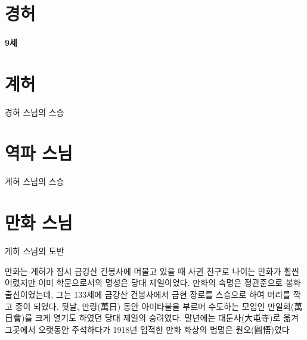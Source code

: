 \documentclass[12pt, a4paper, oneside]{book}
\let\stdsection\section
\renewcommand\section{\newpage\stdsection}
\begin{document}
%										
	\section{ 경허 }


\paragraph{9세}


%										
	\section{ 계허 }
경허 스님의 스승


%										
	\section{ 역파 스님 }

계허 스님의 스승

%										
	\section{ 만화 스님 }

게허 스님의 도반

만화는 계허가 잠시 금강산 건봉사에 머물고 있을 때 사귄 친구로 나이는 만화가 휠씬 어렸지만 이미 학문으로서의 명성은 당대 제일이었다.
만화의 속명은 정관준으로 봉화 출신이었는데, 그는 133세에 금강산 건봉사에서 금현 장로를 스승으로 하여 머리를 깍고 중이 되었다.
뒷날, 만링(萬日) 동안 아미타불을 부르며 수도하는 모임인 만일회(萬日會)를 크게 열기도 하였던 당대 제일의 승려였다.
말년에는 대둔사(大屯寺)로 옮겨 그곳에서 오랫동안 주석하다가 1918년 입적한 만화 화상의 법명은 원오(圓悟)였다


%										
\end{document}
